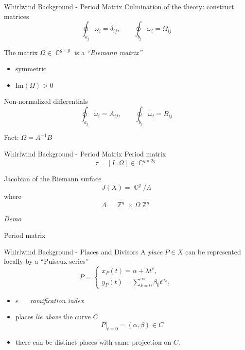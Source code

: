 \documentclass{beamer}
\DeclareMathOperator{\ZZ}{\mathbb{Z}}
\DeclareMathOperator{\CC}{\mathbb{C}}
\begin{document}
\begin{frame}{Whirlwind Background - Period Matrix}{}
  Culmination of the theory: construct matrices
  \[
  \oint_{a_j} \omega_i = \delta_{ij}, \qquad
  \oint_{b_j} \omega_i = \Omega_{ij}
  \]

  \pause

  The matrix $\Omega \in \CC^{g \times g}$ is a {\it ``Riemann matrix''}
  \begin{itemize}[<+->]
  \item symmetric
  \item $\text{Im}(\Omega) > 0$
  \end{itemize}

  \pause

  Non-normalized differentials
  \[
  \oint_{a_j} \tilde{\omega}_i = A_{ij}, \qquad
  \oint_{b_j} \tilde{\omega}_i = B_{ij}
  \]

  \pause

  \begin{center}
  Fact: $\Omega = A^{-1}B$
  \end{center}
\end{frame}


\begin{frame}{Whirlwind Background - Period Matrix}{}
  Period matrix
  \[
  \tau = [I \; \; \Omega] \in \CC^{g \times 2g}
  \]

  \pause

  Jacobian of the Riemann surface
  \[
  J(X) = \CC^g / \Lambda
  \]
  where
  \[
  \Lambda = \ZZ^g \times \, \Omega \ZZ^g
  \]
\end{frame}

\begin{frame}
  \vspace{32pt}
  \begin{center}
    {\Huge \it Demo}

    \vspace{24pt}

    Period matrix
  \end{center}
\end{frame}


\begin{frame}{Whirlwind Background - Places and Divisors}{}
  A {\it place} $P \in X$ can be represented locally by a ``Puiseux series''
  \[
  P =
  \begin{cases}
    x_P(t) = \alpha + \lambda t^e, \\
    y_P(t) = \sum_{k=0}^\infty \beta_k t^{n_k},
  \end{cases}
  \]

  \pause

  \begin{itemize}[<+->]
  \item $e = $ {\it ramification index}
  \item places {\it lie above} the curve $C$
    \[
    P \big|_{t=0} = (\alpha, \beta) \in C
    \]
  \item there can be distinct places with same projection on $C$.
  \end{itemize}
\end{frame}
\end{document}
